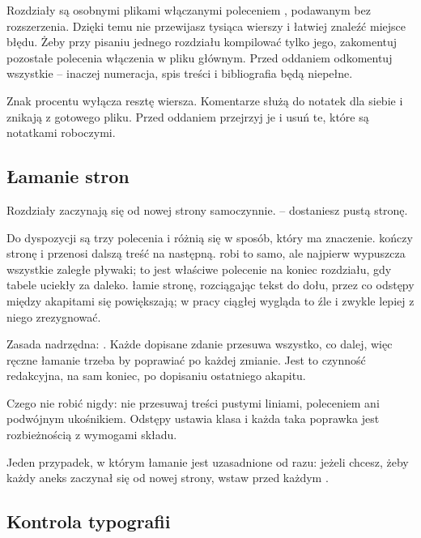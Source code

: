 Rozdziały są osobnymi plikami włączanymi poleceniem , podawanym bez rozszerzenia. Dzięki temu nie przewijasz tysiąca wierszy i łatwiej znaleźć miejsce błędu. Żeby przy pisaniu jednego rozdziału kompilować tylko jego, zakomentuj pozostałe polecenia włączenia w pliku głównym. Przed oddaniem odkomentuj wszystkie -- inaczej numeracja, spis treści i bibliografia będą niepełne.

Znak procentu wyłącza resztę wiersza. Komentarze służą do notatek dla siebie i znikają z gotowego pliku. Przed oddaniem przejrzyj je i usuń te, które są notatkami roboczymi.

\subsection{Łamanie stron}

Rozdziały zaczynają się od nowej strony samoczynnie.  -- dostaniesz pustą stronę.

Do dyspozycji są trzy polecenia i różnią się w sposób, który ma znaczenie.  kończy stronę i przenosi dalszą treść na następną.  robi to samo, ale najpierw wypuszcza wszystkie zaległe pływaki; to jest właściwe polecenie na koniec rozdziału, gdy tabele uciekły za daleko.  łamie stronę, rozciągając tekst do dołu, przez co odstępy między akapitami się powiększają; w pracy ciągłej wygląda to źle i zwykle lepiej z niego zrezygnować.

Zasada nadrzędna: . Każde dopisane zdanie przesuwa wszystko, co dalej, więc ręczne łamanie trzeba by poprawiać po każdej zmianie. Jest to czynność redakcyjna, na sam koniec, po dopisaniu ostatniego akapitu.

Czego nie robić nigdy: nie przesuwaj treści pustymi liniami, poleceniem  ani podwójnym ukośnikiem. Odstępy ustawia klasa i każda taka poprawka jest rozbieżnością z wymogami składu.

Jeden przypadek, w którym łamanie jest uzasadnione od razu: jeżeli chcesz, żeby każdy aneks zaczynał się od nowej strony, wstaw  przed każdym .

\subsection{Kontrola typografii}


